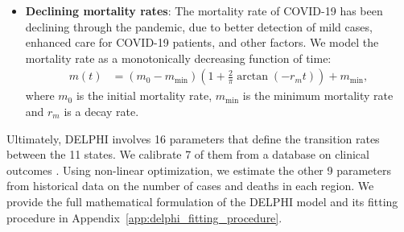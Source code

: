 \documentclass[msom,blindrev]{informs3} %
\begin{document}
\begin{itemize}
\begin{figure}[ht!]
    \caption{Governmental and societal response function $\gamma(t)$ ($\kappa=5$, $t_{\text{int}}=10$, $c=1$, $t_{\text{jump}}=25$ and $\sigma=2$).}
    \label{fig:response_function}
\end{figure}
    \item \textbf{Declining mortality rates}: The mortality rate of COVID-19 has been declining through the pandemic, due to better detection of mild cases, enhanced care for COVID-19 patients, and other factors. We model the mortality rate as a monotonically decreasing function of time:
    \begin{align}
        m(t) &= \left(m_0 - m_{\min}\right)\left(1 + \frac{2}{\pi}\arctan\left(-r_m t\right)\right) \nonumber+ m_{\min}, \label{eq:mortality}
    \end{align}
    where $m_0$ is the initial mortality rate, $m_{\min}$ is the minimum mortality rate and $r_m$ is a decay rate. 
\end{itemize}

Ultimately, DELPHI involves 16 parameters that define the transition rates between the 11 states. We calibrate 7 of them from a database on clinical outcomes . Using non-linear optimization, we estimate the other 9 parameters from historical data on the number of cases and deaths in each region. We provide the full mathematical formulation of the DELPHI model and its fitting procedure in Appendix~\ref{app:delphi_fitting_procedure}. 
\end{document}

